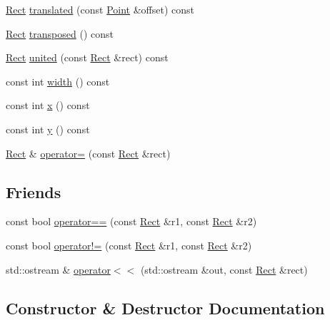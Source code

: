 \begin{DoxyCompactItemize}
\item 
\hyperlink{classprism_1_1_rect}{Rect} \hyperlink{classprism_1_1_rect_ac71993c5f890157af1e3fa86423f8198}{translated} (const \hyperlink{classprism_1_1_point}{Point} \&offset) const 
\item 
\hyperlink{classprism_1_1_rect}{Rect} \hyperlink{classprism_1_1_rect_aa4f9bf21ac8c5a1d1b415df78ef5c0da}{transposed} () const 
\item 
\hyperlink{classprism_1_1_rect}{Rect} \hyperlink{classprism_1_1_rect_ac938b0ebead7062111728b6d2392e38a}{united} (const \hyperlink{classprism_1_1_rect}{Rect} \&rect) const 
\item 
const int \hyperlink{classprism_1_1_rect_a8dae47a50fdac7a5f7e8aabef68437aa}{width} () const 
\item 
const int \hyperlink{classprism_1_1_rect_a202fa9a56964c9111a968fb9b420f5f4}{x} () const 
\item 
const int \hyperlink{classprism_1_1_rect_a6e951744e0bba0fed781b86ab0be680b}{y} () const 
\item 
\hyperlink{classprism_1_1_rect}{Rect} \& \hyperlink{classprism_1_1_rect_a1addf86103e655c776e4e20dd3c97a84}{operator=} (const \hyperlink{classprism_1_1_rect}{Rect} \&rect)
\end{DoxyCompactItemize}
\subsection*{Friends}
\begin{DoxyCompactItemize}
\item 
const bool \hyperlink{classprism_1_1_rect_ab32eafa53d6e2fedc5c4f4beeb10d12a}{operator==} (const \hyperlink{classprism_1_1_rect}{Rect} \&r1, const \hyperlink{classprism_1_1_rect}{Rect} \&r2)
\item 
const bool \hyperlink{classprism_1_1_rect_a649643043218228aae2b7d95e1a95dba}{operator!=} (const \hyperlink{classprism_1_1_rect}{Rect} \&r1, const \hyperlink{classprism_1_1_rect}{Rect} \&r2)
\item 
std\+::ostream \& \hyperlink{classprism_1_1_rect_a729ddc4e5633a601a2813d124209056f}{operator$<$$<$} (std\+::ostream \&out, const \hyperlink{classprism_1_1_rect}{Rect} \&rect)
\end{DoxyCompactItemize}


\subsection{Constructor \& Destructor Documentation}

